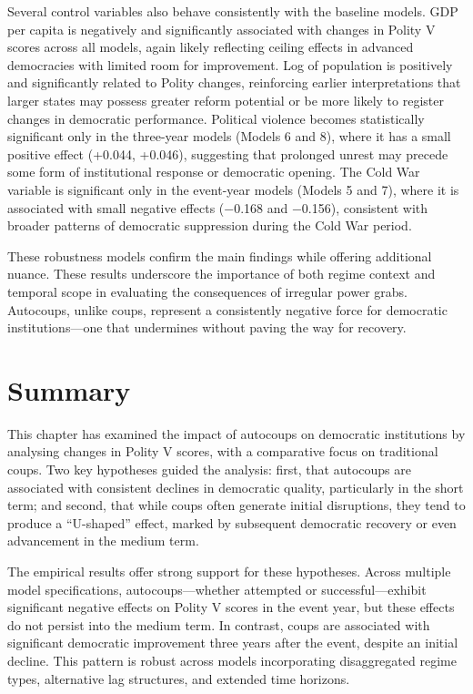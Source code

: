 \documentclass[
  12pt,
]{report}
\begin{document}
Several control variables also behave consistently with the baseline
models. GDP per capita is negatively and significantly associated with
changes in Polity V scores across all models, again likely reflecting
ceiling effects in advanced democracies with limited room for
improvement. Log of population is positively and significantly related
to Polity changes, reinforcing earlier interpretations that larger
states may possess greater reform potential or be more likely to
register changes in democratic performance. Political violence becomes
statistically significant only in the three-year models (Models 6 and
8), where it has a small positive effect (+0.044, +0.046), suggesting
that prolonged unrest may precede some form of institutional response or
democratic opening. The Cold War variable is significant only in the
event-year models (Models 5 and 7), where it is associated with small
negative effects (−0.168 and −0.156), consistent with broader patterns
of democratic suppression during the Cold War period.

These robustness models confirm the main findings while offering
additional nuance. These results underscore the importance of both
regime context and temporal scope in evaluating the consequences of
irregular power grabs. Autocoups, unlike coups, represent a consistently
negative force for democratic institutions---one that undermines without
paving the way for recovery.

\section{Summary}\label{summary-3}

This chapter has examined the impact of autocoups on democratic
institutions by analysing changes in Polity V scores, with a comparative
focus on traditional coups. Two key hypotheses guided the analysis:
first, that autocoups are associated with consistent declines in
democratic quality, particularly in the short term; and second, that
while coups often generate initial disruptions, they tend to produce a
``U-shaped'' effect, marked by subsequent democratic recovery or even
advancement in the medium term.

The empirical results offer strong support for these hypotheses. Across
multiple model specifications, autocoups---whether attempted or
successful---exhibit significant negative effects on Polity V scores in
the event year, but these effects do not persist into the medium term.
In contrast, coups are associated with significant democratic
improvement three years after the event, despite an initial decline.
This pattern is robust across models incorporating disaggregated regime
types, alternative lag structures, and extended time horizons.
\end{document}
